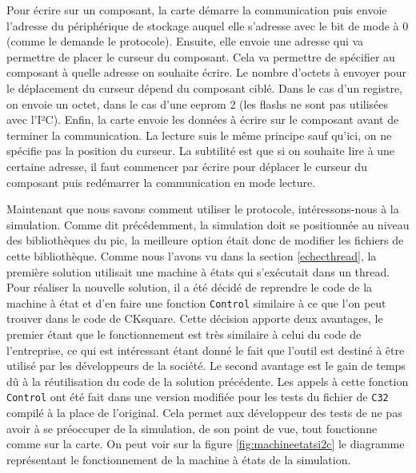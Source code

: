 \documentclass[a4paper]{article}
\begin{document}
Pour écrire sur un composant, la carte démarre la communication puis envoie
l'adresse du périphérique de stockage auquel elle s'adresse avec le bit de mode à
0 (comme le demande le protocole). Ensuite, elle envoie une adresse qui va
permettre de placer le curseur du composant. Cela va permettre de spécifier au
composant à quelle adresse on souhaite écrire. Le nombre d'octets à envoyer pour
le déplacement du curseur dépend du composant ciblé. Dans le cas d'un registre,
on envoie un octet, dans le cas d'une eeprom 2 (les flashs ne sont pas utilisées
avec l'I²C). Enfin, la carte envoie les données à écrire sur le composant avant
de terminer la communication. La lecture suis le même principe sauf qu'ici, on
ne spécifie pas la position du curseur. La subtilité est que si on souhaite lire
à une certaine adresse, il faut commencer par écrire pour déplacer le curseur du
composant puis redémarrer la communication en mode lecture.

Maintenant que nous savons comment utiliser le protocole, intéressons-nous à la
simulation. Comme dit précédemment, la simulation doit se positionnée au niveau
des bibliothèques du \gls{pic}, la meilleure option était donc de modifier les
fichiers de cette bibliothèque. Comme nous l'avons vu dans la section
\ref{echecthread}, la première solution utilisait une machine à états qui
s'exécutait dans un thread. Pour réaliser la nouvelle solution, il a été décidé
de reprendre le code de la machine à état et d'en faire une fonction
\verb|Control| similaire à ce que l'on peut trouver dans le code de
CKsquare. Cette décision apporte deux avantages, le premier étant que le
fonctionnement est très similaire à celui du code de l'entreprise, ce qui est
intéressant étant donné le fait que l'outil est destiné à être utilisé par les
développeurs de la société. Le second avantage est le gain de temps dû à la
réutilisation du code de la solution précédente. Les appels à cette fonction
\verb|Control| ont été fait dans une version modifiée pour les tests du
fichier de \verb|C32| compilé à la place de l'original. Cela permet aux développeur
 des tests de ne pas avoir à se préoccuper de la simulation, de son
point de vue, tout fonctionne comme sur la carte. On peut voir sur la figure
\ref{fig:machineetatsi2c} le diagramme représentant le fonctionnement de la
machine à états de la simulation.
\end{document}

